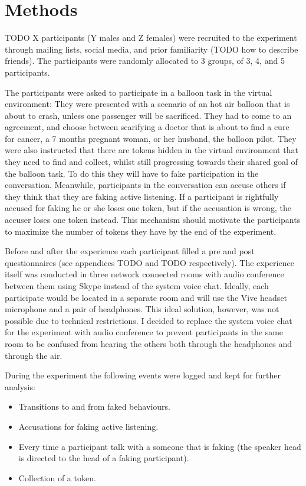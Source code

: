 \documentclass[]{simple-thesis}
\begin{document}
\section{Methods}

TODO X participants (Y males and Z females) were recruited to the experiment through mailing lists, social media, and prior familiarity (TODO how to describe friends).
The participants were randomly allocated to 3 groups, of 3, 4, and 5 participants.

The participants were asked to participate in a balloon task \citep{Howes2012} in the virtual environment:
They were presented with a scenario of an hot air balloon that is about to crash, unless one passenger will be sacrificed.
They had to come to an agreement, and choose between scarifying a doctor that is about to find a cure for cancer, a 7 months pregnant woman, or her husband, the balloon pilot.
They were also instructed that there are tokens hidden in the virtual environment that they need to find and collect, whilst still progressing towards their shared goal of the balloon task.
To do this they will have to fake participation in the conversation.
Meanwhile, participants in the conversation can accuse others if they think that they are faking active listening.
If a participant is rightfully accused for faking he or she loses one token, but if the accusation is wrong, the accuser loses one token instead.
This mechanism should motivate the participants to maximize the number of tokens they have by the end of the experiment.

Before and after the experience each participant filled a pre and post questionnaires (see appendices TODO and TODO respectively).
The experience itself was conducted in three network connected rooms with audio conference between them using Skype instead of the system voice chat.
Ideally, each participate would be located in a separate room and will use the Vive headset microphone and a pair of headphones.
This ideal solution, however, was not possible due to technical restrictions.
I decided to replace the system voice chat for the experiment with audio conference to prevent participants in the same room to be confused from hearing the others both through the headphones and through the air.

During the experiment the following events were logged and kept for further analysis:

\begin{itemize}
  \item Transitions to and from faked behaviours.
  \item Accusations for faking active listening.
  \item Every time a participant talk with a someone that is faking (the speaker head is directed to the head of a faking participant).
  \item Collection of a token.
\end{itemize}
\end{document}
